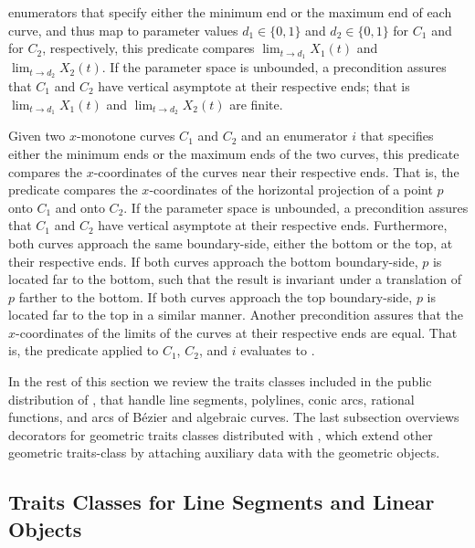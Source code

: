 \begin{description}
    enumerators that specify either the minimum end or the maximum
    end of each curve, and thus map to parameter values
    $d_1\in \{0,1\}$ and $d_2 \in \{0,1\}$ for $C_1$ and for $C_2$,
    respectively, this predicate compares
    $\lim_{t \rightarrow d_1} X_1(t)$ and $\lim_{t \rightarrow d_2} X_2(t)$.
    If the parameter space is unbounded, a precondition assures that
    $C_1$ and $C_2$ have vertical asymptote at their respective ends;
    that is $\lim_{t \rightarrow d_1} X_1(t)$ and
    $\lim_{t \rightarrow d_2} X_2(t)$ are finite.
%
\item[\ccc{Compare_x_near_limit_2}:]
  Given two $x$-monotone curves $C_1$ and $C_2$ and an enumerator $i$
  that specifies either the minimum ends or the maximum ends of the
  two curves, this predicate compares the $x$-coordinates of the
  curves near their respective ends. That is, the predicate compares
  the $x$-coordinates of the horizontal projection of a point $p$
  onto $C_1$ and onto $C_2$. If the parameter space is unbounded, a
  precondition assures that $C_1$ and $C_2$ have vertical asymptote
  at their respective ends. Furthermore, both curves approach the
  same boundary-side, either the bottom or the top, at their
  respective ends. If both curves approach the bottom boundary-side,
  $p$ is located far to the bottom, such that the result is invariant
  under a translation of $p$ farther to the bottom. If both curves
  approach the top boundary-side, $p$ is located far to the top in a
  similar manner. Another precondition assures that the
  $x$-coordinates of the limits of the curves at their respective
  ends are equal. That is, the predicate 
  applied to $C_1$, $C_2$, and $i$ evaluates to .
\end{description}

In the rest of this section we review the traits classes
included in the public distribution of \cgal, that handle line
segments, polylines, conic arcs, rational functions, and arcs of
B\'{e}zier and algebraic curves. 
The last subsection overviews
decorators for geometric traits classes distributed with \cgal,
which extend other geometric traits-class by attaching auxiliary
data with the geometric objects.

\subsection{Traits Classes for Line Segments and Linear Objects
\label{arr_ssec:tr_segs}}

